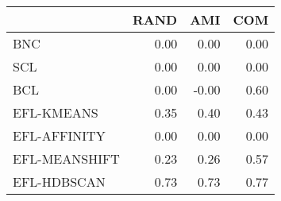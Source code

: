 \begin{tabular}{lrrr}
\toprule
 & RAND & AMI & COM \\
\midrule
BNC & 0.00 & 0.00 & 0.00 \\
SCL & 0.00 & 0.00 & 0.00 \\
BCL & 0.00 & -0.00 & 0.60 \\
EFL-KMEANS & 0.35 & 0.40 & 0.43 \\
EFL-AFFINITY & 0.00 & 0.00 & 0.00 \\
EFL-MEANSHIFT & 0.23 & 0.26 & 0.57 \\
EFL-HDBSCAN & 0.73 & 0.73 & 0.77 \\
\bottomrule
\end{tabular}
